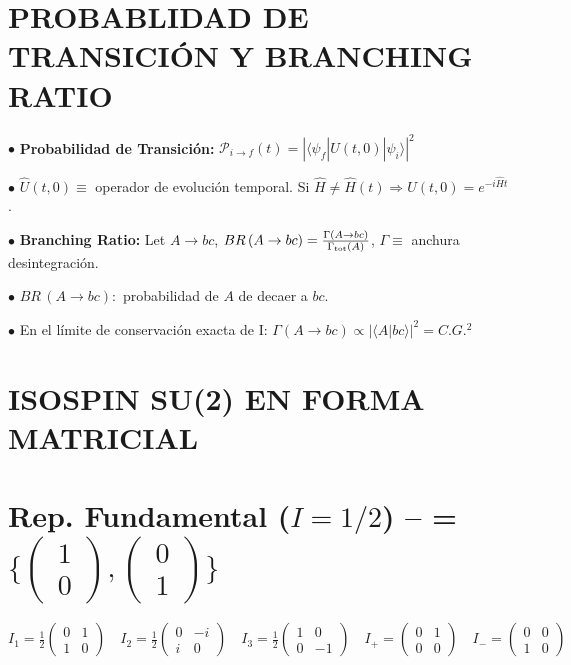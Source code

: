 \section{PROBABLIDAD DE TRANSICIÓN Y BRANCHING RATIO}
$\bullet$ \textbf{Probabilidad de Transición:} $\mathcal{P}_{i \to f}(t) = \left| \langle \psi_f | \hat{U}(t, 0) | \psi_i \rangle \right|^2$

 $\bullet$ $\hat{U}(t, 0) \equiv$ operador de evolución temporal. Si $\hat{H} \neq \hat{H}(t) \Rightarrow \hat{U}(t, 0) = e^{-i \hat{H} t}$.


$\bullet$ \textbf{Branching Ratio:} Let $A \rightarrow bc$, $BR \,(A\rightarrow bc)= \frac{\Gamma(A\rightarrow bc)}{\Gamma_{\rm tot} (A)}$, $\Gamma\equiv$ anchura desintegración. 

$\bullet$ $BR \,(A\rightarrow bc):$ probabilidad de $A$ de decaer a $bc$.

$\bullet$ En el límite de conservación exacta de I: $\Gamma(A \rightarrow bc) \propto |\langle A|bc \rangle| ^2  = C.G.^2$

\section{ISOSPIN SU(2) EN FORMA MATRICIAL}

\section*{Rep. Fundamental ($I=1/2$) --   = $\{\left(\begin{smallmatrix}
    1\\
    0
\end{smallmatrix}\right), \left(\begin{smallmatrix}
    0\\
    1
\end{smallmatrix}\right)\} $}
$
I_1 = \frac{1}{2} \left(\begin{smallmatrix} 0 & 1 \\ 1 & 0 \end{smallmatrix}\right) \quad
    I_2 = \frac{1}{2} \left(\begin{smallmatrix} 0 & -i \\ i & 0 \end{smallmatrix}\right) \quad
    I_3 = \frac{1}{2} \left(\begin{smallmatrix} 1 & 0 \\ 0 & -1 \end{smallmatrix}\right) \quad
    I_+ = \left(\begin{smallmatrix} 0 & 1 \\ 0 & 0 \end{smallmatrix}\right) \quad
    I_- = \left(\begin{smallmatrix} 0 & 0 \\ 1 & 0 \end{smallmatrix}\right)
$


